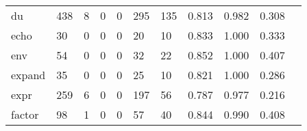 \begin{longtable}{lp{1.2cm}p{1.2cm}p{1.2cm}p{1.2cm}p{1.2cm}p{1.2cm}p{1.2cm}p{1.2cm}p{1.2cm}p{1.2cm}}
du        &                                   438 &                                                  8 &                                                  0 &                                                  0 &                                                295 &                                                135 &                                              0.813 &                                              0.982 &                                              0.308 \\
echo      &                                    30 &                                                  0 &                                                  0 &                                                  0 &                                                 20 &                                                 10 &                                              0.833 &                                              1.000 &                                              0.333 \\
env       &                                    54 &                                                  0 &                                                  0 &                                                  0 &                                                 32 &                                                 22 &                                              0.852 &                                              1.000 &                                              0.407 \\
expand    &                                    35 &                                                  0 &                                                  0 &                                                  0 &                                                 25 &                                                 10 &                                              0.821 &                                              1.000 &                                              0.286 \\
expr      &                                   259 &                                                  6 &                                                  0 &                                                  0 &                                                197 &                                                 56 &                                              0.787 &                                              0.977 &                                              0.216 \\
factor    &                                    98 &                                                  1 &                                                  0 &                                                  0 &                                                 57 &                                                 40 &                                              0.844 &                                              0.990 &                                              0.408 \\

\end{longtable}
